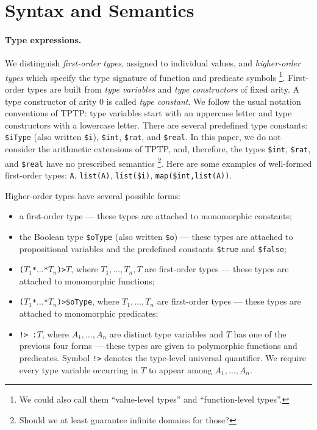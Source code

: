 \section{Syntax and Semantics} \label{sec_logic}

\paragraph{Type expressions.}
We distinguish {\em first-order types}, assigned
to individual values, and {\em higher-order types} which
specify the type signature of function and predicate symbols%
\footnote{We could also call them ``value-level types'' and
``function-level types''.}.
%
First-order types are built from {\em type variables\/}
and {\em type constructors\/} of fixed arity. A type constructor
of arity 0 is called {\em type constant}. We follow the usual
notation conventions of TPTP: type variables start with an
uppercase letter and type constructors with a lowercase letter.
There are several predefined type constants:
\verb+$iType+ (also written \verb+$i+),
\verb+$int+, \verb+$rat+, and \verb+$real+. In this paper,
we do not consider the arithmetic extensions of TPTP, and,
therefore, the types \verb+$int+, \verb+$rat+, and \verb+$real+
have no prescribed semantics%
\footnote{Should we at least guarantee infinite domains for those?}.
Here are some examples of well-formed first-order types:
\verb+A+, \verb+list(A)+, \verb+list($i)+, \verb+map($int,list(A))+.

Higher-order types have several possible forms:
\begin{itemize}
\item a first-order type --- these types are attached to
monomorphic constants;
\item the Boolean type \verb+$oType+ (also written \verb+$o+)
--- these types are attached to propositional variables and
the predefined constants \verb+$true+ and \verb+$false+;
\item {\tt ($T_1$\;*\;${\dots}$\;*\;$T_n$)\;>\;$T$},
where $T_1,\dots,T_n,T$ are first-order types ---
these types are attached to monomorphic functions;
\item {\tt ($T_1$\;*\;${\dots}$\;*\;$T_n$)\;>\;\$oType},
where $T_1,\dots,T_n$ are first-order types --- these types
are attached to monomorphic predicates;
\item {\tt !>\,:\;$T$}, where $A_1,\dots,A_n$ are distinct
type variables and $T$ has one of the previous four forms ---
these types are given to polymorphic functions and predicates.
Symbol {\tt !>} denotes the type-level universal quantifier.
We require every type variable occurring in $T$ to appear
among $A_1,\dots,A_n$.
\end{itemize}


